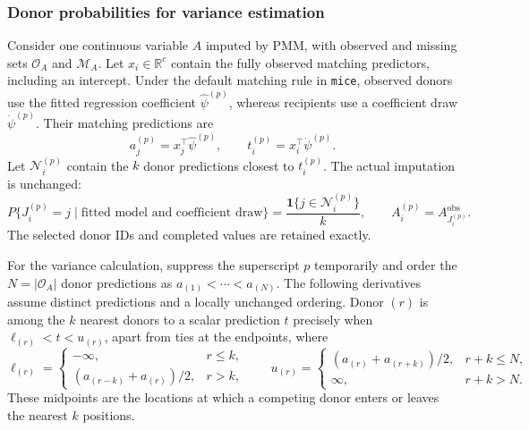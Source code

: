 \subsubsection{Donor probabilities for variance estimation}
\label{smooth-copied-donor}
Consider one continuous variable \(A\) imputed by PMM, with observed
and missing sets \(\mathcal O_A\) and \(\mathcal M_A\). Let
\(x_i\in\mathbb R^c\) contain the fully observed matching predictors,
including an intercept. Under the default matching rule in \texttt{mice},
observed donors use the fitted regression coefficient
\(\hat\psi^{(p)}\), whereas recipients use a coefficient draw
\(\dot\psi^{(p)}\). Their matching predictions are
\[
a_j^{(p)}=x_j^\top\hat\psi^{(p)},\qquad
t_i^{(p)}=x_i^\top\dot\psi^{(p)}.
\]
Let \(\mathcal N_i^{(p)}\) contain the \(k\) donor predictions closest
to \(t_i^{(p)}\). The actual imputation is unchanged:
\[
P\{J_i^{(p)}=j\mid\text{fitted model and coefficient draw}\}
=\frac{\mathbf 1\{j\in\mathcal N_i^{(p)}\}}{k},
\qquad A_i^{(p)}=A_{J_i^{(p)}}^{\mathrm{obs}}.
\]
The selected donor IDs and completed values are retained exactly.

For the variance calculation, suppress the superscript \(p\) temporarily
and order the \(N=|\mathcal O_A|\) donor predictions as
\(a_{(1)}<\cdots<a_{(N)}\). The following derivatives assume distinct
predictions and a locally unchanged ordering. Donor \((r)\) is among
the \(k\) nearest donors to a scalar prediction \(t\) precisely when
\(\ell_{(r)}<t<u_{(r)}\), apart from ties at the endpoints, where
\[
\ell_{(r)}=
\begin{cases}
-\infty,&r\leq k,\\
(a_{(r-k)}+a_{(r)})/2,&r>k,
\end{cases}
\qquad
u_{(r)}=
\begin{cases}
(a_{(r)}+a_{(r+k)})/2,&r+k\leq N,\\
\infty,&r+k>N.
\end{cases}
\]
These midpoints are the locations at which a competing donor enters or
leaves the nearest \(k\) positions.

